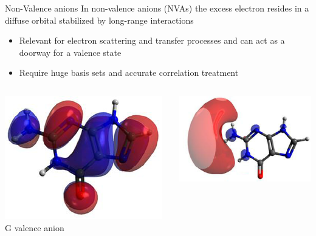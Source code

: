 \documentclass[9pt,t,xcolor=table]{beamer}
\begin{document}
\begin{frame}{\huge Non-Valence anions}\large
	In non-valence anions (NVAs) the excess electron resides in a diffuse orbital stabilized by long-range interactions
	\vspace{5pt}
	\begin{itemize} 
		\item Relevant for electron scattering and transfer processes and can act as a doorway for a valence state
		\item Require huge basis sets and accurate correlation treatment
	\end{itemize}
	\vspace{5pt}
	\begin{columns}
		\begin{column}{0.27\textwidth}
			\centering
			\includegraphics[width=\textwidth]{Figs/vbaDNA.png}
			G valence anion
		\end{column}
		\begin{column}{0.3\textwidth}
			\centering
			\includegraphics[width=\textwidth]{Figs/dbaDNA.png}

\end{column}
\end{columns}
\end{frame}
\end{document}
